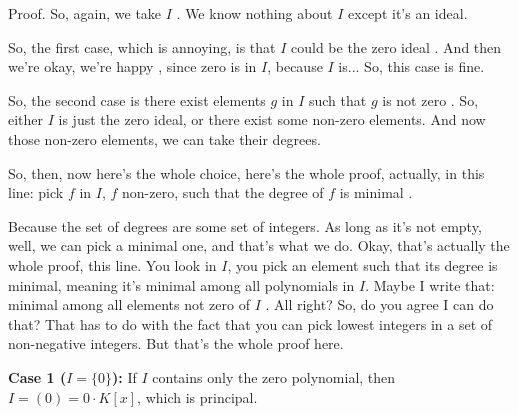 \begin{proofWrapper}

\begin{speech}[00:34:09 - 00:35:48]
Proof.  So, again, we take $I$ . We know nothing about $I$ except it's an ideal.

So, the first case, which is annoying, is that $I$ could be the zero ideal . And then we're okay, we're happy , since zero is in $I$, because $I$ is... So, this case is fine.

So, the second case is there exist elements $g$ in $I$ such that $g$ is not zero . So, either $I$ is just the zero ideal, or there exist some non-zero elements. And now those non-zero elements, we can take their degrees.

So, then, now here's the whole choice, here's the whole proof, actually, in this line: pick $f$ in $I$, $f$ non-zero, such that the degree of $f$ is minimal .

Because the set of degrees are some set of integers. As long as it's not empty, well, we can pick a minimal one, and that's what we do. Okay, that's actually the whole proof, this line. You look in $I$, you pick an element such that its degree is minimal, meaning it's minimal among all polynomials in $I$. Maybe I write that: minimal among all elements not zero of $I$ . All right? So, do you agree I can do that? That has to do with the fact that you can pick lowest integers in a set of non-negative integers. But that's the whole proof here.
\end{speech}

\begin{hidden}
\end{hidden}

\begin{content}
\textbf{Case 1 ($I = \{0\}$):}
If $I$ contains only the zero polynomial, then $I = (0) = 0 \cdot K[x]$, which is principal.


\end{content}
\end{proofWrapper}
